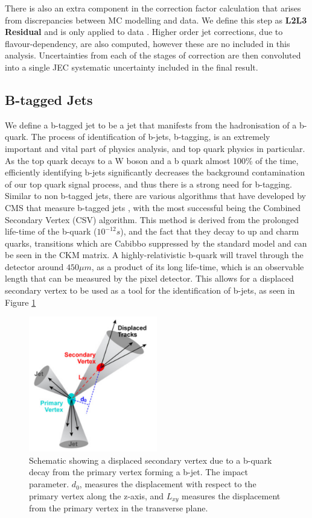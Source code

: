 There is also an extra component in the correction factor calculation that arises from discrepancies between MC modelling and data. We define this step as \textbf{L2L3 Residual} and is only applied to data \cite{1748-0221-6-11-P11002}. Higher order jet corrections, due to flavour-dependency, are also computed, however these are no included in this analysis. Uncertainties from each of the stages of correction are then convoluted into a single JEC systematic uncertainty included in the final result.  

\subsection{B-tagged Jets}

We define a b-tagged jet to be a jet that manifests from the hadronisation of a b-quark. The process of identification of b-jets, b-tagging, is an extremely important and vital part of physics analysis, and top quark physics in particular. As the top quark decays to a W boson and a b quark almost 100\% of the time, efficiently identifying b-jets significantly decreases the background contamination of our top quark signal process, and thus there is a strong need for b-tagging. Similar to non b-tagged jets, there are various algorithms that have developed by CMS that measure b-tagged jets \cite{Chatrchyan:2012jua}, with the most successful being the Combined Secondary Vertex (CSV) algorithm. This method is derived from the prolonged life-time of the b-quark ($10^{-12}s$), and the fact that they decay to up and charm quarks, transitions which are Cabibbo suppressed by the standard model and can be seen in the CKM matrix. A highly-relativistic b-quark will travel through the detector around $450 \mu m$, as a product of its long life-time, which is an observable length that can be measured by the pixel detector. This allows for a displaced secondary vertex to be used as a tool for the identification of b-jets, as seen in Figure \ref{fig-CSV}

\begin{figure} \label{fig-CSV}
\begin{center}
\includegraphics[width=0.5\textwidth]{Figures/CSV.png}
\caption{Schematic showing a displaced secondary vertex due to a b-quark decay from the primary vertex forming a b-jet. The impact parameter. $d_0$, measures the displacement with respect to the primary vertex along the z-axis, and $L_{xy}$ measures the displacement from the primary vertex in the transverse plane.}
\end{center}
\end{figure}

